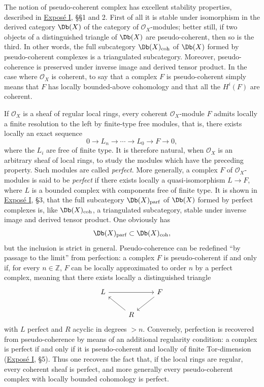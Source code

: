 The notion of pseudo-coherent complex has excellent stability properties, described in \hyperlink{sga6.e01.expose}{Exposé I}, §§1 and 2. First of all it is stable under isomorphism in the derived category \(\Db(X)\) of the category of \(\mathcal O_X\)-modules; better still, if two objects of a distinguished triangle of \(\Db(X)\) are pseudo-coherent, then so is the third. In other words, the full subcategory \(\Db(X)_{\mathrm{coh}}\) of \(\Db(X)\) formed by pseudo-coherent complexes is a triangulated subcategory. Moreover, pseudo-coherence is preserved under inverse image and derived tensor product. In the case where \(\mathcal O_X\) is coherent, to say that a complex \(F\) is pseudo-coherent simply means that \(F\) has locally bounded-above cohomology and that all the \(H^i(F)\) are coherent.

If \(\mathcal O_X\) is a sheaf of regular local rings, every coherent \(\mathcal O_X\)-module \(F\) admits locally a finite resolution to the left by finite-type free modules, that is, there exists locally an exact sequence
\[
  0\longrightarrow L_n\longrightarrow \cdots \longrightarrow L_0\longrightarrow F\longrightarrow 0,
\]
where the \(L_i\) are free of finite type. It is therefore natural, when \(\mathcal O_X\) is an arbitrary sheaf of local rings, to study the modules which have the preceding property. Such modules are called \emph{perfect}. More generally, a complex \(F\) of \(\mathcal O_X\)-modules is said to be \emph{perfect} if there exists locally a quasi-isomorphism \(L\to F\), where \(L\) is a bounded complex with components free of finite type. It is shown in \hyperlink{sga6.e01.expose}{Exposé I}, §3, that the full subcategory \(\Db(X)_{\mathrm{parf}}\) of \(\Db(X)\) formed by perfect complexes is, like \(\Db(X)_{\mathrm{coh}}\), a triangulated subcategory, stable under inverse image and derived tensor product. One obviously has
\[
  \Db(X)_{\mathrm{parf}}\subset \Db(X)_{\mathrm{coh}},
\]
but the inclusion is strict in general. Pseudo-coherence can be redefined ``by passage to the limit'' from perfection: a complex \(F\) is pseudo-coherent if and only if, for every \(n\in\mathbb Z\), \(F\) can be locally approximated to order \(n\) by a perfect complex, meaning that there exists locally a distinguished triangle
\[
\begin{tikzcd}
L \arrow[rr] && F \arrow[dl]\\
& R \arrow[ul] &
\end{tikzcd}
\]
with \(L\) perfect and \(R\) acyclic in degrees \(>n\). Conversely, perfection is recovered from pseudo-coherence by means of an additional regularity condition: a complex is perfect if and only if it is pseudo-coherent and locally of finite Tor-dimension (\hyperlink{sga6.e01.expose}{Exposé I}, §5). Thus one recovers the fact that, if the local rings are regular, every coherent sheaf is perfect, and more generally every pseudo-coherent complex with locally bounded cohomology is perfect.

